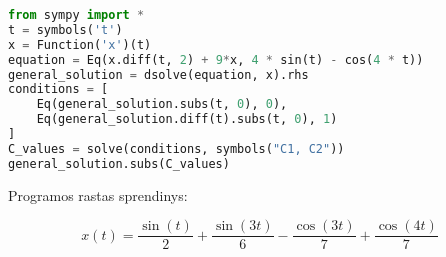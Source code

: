 \documentclass[11pt]{article}
\begin{document}
\begin{lstlisting}[language=Python]
from sympy import *
t = symbols('t')
x = Function('x')(t)
equation = Eq(x.diff(t, 2) + 9*x, 4 * sin(t) - cos(4 * t))
general_solution = dsolve(equation, x).rhs
conditions = [
    Eq(general_solution.subs(t, 0), 0),
    Eq(general_solution.diff(t).subs(t, 0), 1)
]
C_values = solve(conditions, symbols("C1, C2"))
general_solution.subs(C_values)
\end{lstlisting}

Programos rastas sprendinys:

$$
x(t)=\frac{\sin(t)}{2}+\frac{\sin(3t)}{6}-\frac{\cos(3t)}{7}+\frac{\cos(4t)}{7}
$$
\end{document}
